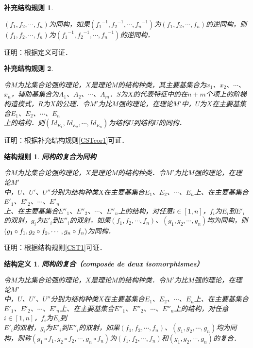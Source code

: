 \documentclass[12pt, a4paper, oneside]{book}
\newtheorem{STdef}{结构定义}
\newtheorem{CST}{结构规则}
\newtheorem{CSTcor}{补充结构规则}
\begin{document}
			\begin{CSTcor}\label{CSTcor5}
				\hfill\par
				$(f_1, f_2, \cdots, f_n)$为同构，如果$({f_1}^{-1}, {f_2}^{-1}, \cdots, {f_n}^{-1})$为$(f_1, f_2, \cdots, f_n)$的逆同构，则\\$(f_1, f_2, \cdots, f_n)$为$({f_1}^{-1}, {f_2}^{-1}, \cdots, {f_n}^{-1})$的逆同构．
			\end{CSTcor}
			证明：根据定义可证．
		
			\begin{CSTcor}\label{CSTcor6}
				\hfill\par
				令$M$为比集合论强的理论，$X$是理论$M$的结构种类，其主要基集合为$x_1$、$x_2$、$\cdots$、$x_n$，辅助基集合为$A_1$、$A_2$、$\cdots$、$A_m$．$S$为$X$的代表特征中的在$n+m$个项上的阶梯构造模式，$R$为$X$的公理．令$M'$为比$M$强的理论，在理论$M'$中，$U$为$X$在主要基集合$E_1$、$E_2$、$\cdots$、$E_n$\\上的结构．则$(Id_{E_1}, Id_{E_2}, \cdots, Id_{E_n})$为结构$U$到结构$U$的同构．
			\end{CSTcor}
			证明：根据补充结构规则\ref{CSTcor1}可证．
			
			\begin{CST}\label{CST4}
				\textbf{同构的复合为同构}
				\par
				令$M$为比集合论强的理论，$X$是理论$M$的结构种类．令$M'$为比$M$强的理论，在理论$M'$\\中，$U$、$U'$、$U''$分别为结构种类$X$在主要基集合$E_1$、$E_2$、$\cdots$、$E_n$上、在主要基集合${E'}_1$、${E'}_2$、$\cdots$、${E'}_n$\\上、在主要基集合${E''}_1$、${E''}_2$、$\cdots$、${E''}_n$上的结构，对任意$i\in [1, n]$，$f_i$为$E_i$到${E'}_i$的双射，$g_i$为${E'}_i$到${E''}_i$的双射，如果$(f_1, f_2, \cdots, f_n)$、$(g_1, g_2, \cdots, g_n)$均为同构，则$(g_1\circ f_1, g_2\circ f_2, \cdots, \\g_n\circ f_n)$为同构．
			\end{CST}
			证明：根据结构规则\ref{CST1}可证．
						
			\begin{STdef}
				\textbf{同构的复合（composée de deux isomorphismes）}
				\par
				令$M$为比集合论强的理论，$X$是理论$M$的结构种类．令$M'$为比$M$强的理论，在理论$M'$\\中，$U$、$U'$、$U''$分别为结构种类$X$在主要基集合$E_1$、$E_2$、$\cdots$、$E_n$上、在主要基集合${E'}_1$、${E'}_2$、$\cdots$、${E'}_n$上、在主要基集合${E''}_1$、${E''}_2$、$\cdots$、${E''}_n$上的结构，对任意$i\in [1, n]$，$f_i$为$E_i$到\\${E'}_i$的双射，$g_i$为${E'}_i$到${E''}_i$的双射，如果$(f_1, f_2, \cdots, f_n)$、$(g_1, g_2, \cdots, g_n)$均为同构，则称$(g_1\circ f_1, g_2\circ f_2, \cdots, g_n\circ f_n)$为$(f_1, f_2, \cdots, f_n)$和$(g_1, g_2, \cdots, g_n)$的复合．
			\end{STdef}
			
\end{document}
